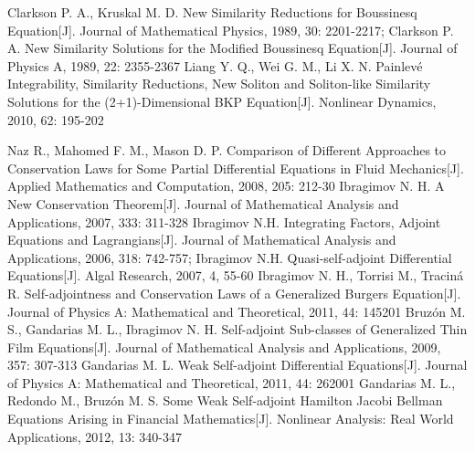 \begin{thebibliography}{0}
 Clarkson P. A., Kruskal M. D. New Similarity Reductions for Boussinesq Equation[J]. Journal of Mathematical Physics, 1989, 30: 2201-2217;
   Clarkson  P. A. New Similarity Solutions for the Modified Boussinesq Equation[J]. Journal of Physics A, 1989, 22: 2355-2367
 Liang Y. Q., Wei G. M., Li X. N. Painlev\'{e} Integrability, Similarity Reductions, New Soliton and Soliton-like Similarity Solutions for the (2+1)-Dimensional BKP Equation[J]. Nonlinear Dynamics, 2010, 62: 195-202%


 Naz R., Mahomed F. M., Mason D. P. Comparison of Different Approaches to Conservation Laws for Some Partial Differential Equations in Fluid Mechanics[J]. Applied Mathematics and Computation, 2008, 205: 212-30
 Ibragimov N. H. A New Conservation Theorem[J]. Journal of Mathematical Analysis and Applications, 2007, 333: 311-328
 Ibragimov N.H. Integrating Factors, Adjoint Equations and Lagrangians[J]. Journal of Mathematical Analysis and Applications, 2006, 318: 742-757; Ibragimov N.H. Quasi-self-adjoint Differential Equations[J]. Algal Research, 2007, 4, 55-60%
 Ibragimov N. H., Torrisi M., Tracin\'{a} R. Self-adjointness and Conservation Laws of a Generalized Burgers Equation[J]. Journal of Physics A: Mathematical and Theoretical, 2011, 44: 145201
 Bruz\'{o}n M. S., Gandarias M. L., Ibragimov N. H. Self-adjoint Sub-classes of Generalized Thin Film Equations[J]. Journal of Mathematical  Analysis and Applications, 2009, 357: 307-313
 Gandarias M. L. Weak Self-adjoint Differential Equations[J]. Journal of Physics A: Mathematical and Theoretical, 2011, 44: 262001
 Gandarias M. L., Redondo M., Bruz\'{o}n M. S. Some Weak Self-adjoint Hamilton Jacobi Bellman Equations Arising in Financial Mathematics[J]. Nonlinear Analysis: Real World Applications, 2012, 13: 340-347

\end{thebibliography}
\cleardoublepage
